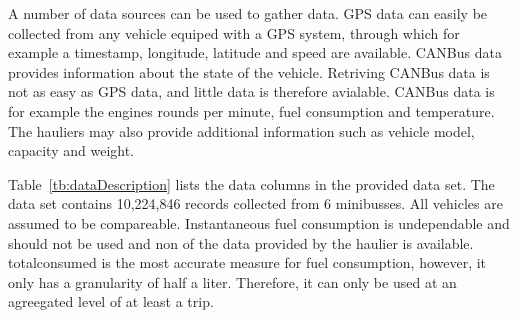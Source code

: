 A number of data sources can be used to gather data.
GPS data can easily be collected from any vehicle equiped with a GPS system, through which for example a timestamp, longitude, latitude and speed are available.
CANBus data provides information about the state of the vehicle.  %
Retriving CANBus data is not as easy as GPS data, and little data is therefore avialable. 
CANBus data is for example the engines rounds per minute, fuel consumption and temperature. 
The hauliers may also provide additional information such as vehicle model, capacity and weight. 

Table~\ref{tb:dataDescription} lists the data columns in the provided data set.
The data set contains 10,224,846 records collected from 6 minibusses. 
All vehicles are assumed to be compareable.%
Instantaneous fuel consumption is undependable and should not be used and non of the data provided by the haulier is available.
totalconsumed is the most accurate measure for fuel consumption, however, it only has a granularity of half a liter. Therefore, it can only be used at an agreegated level of at least a trip.